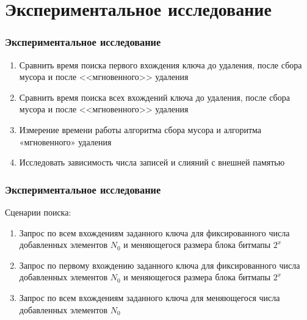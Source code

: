 \documentclass[aspectratio=169, pdf, 8pt, unicode]{beamer}
\begin{document}
\section{Экспериментальное исследование}

\begin{frame}[fragile]
\frametitle{Экспериментальное исследование}

\begin{enumerate}
    \item Сравнить время поиска первого вхождения ключа до удаления,
    после сбора мусора и после <<мгновенного>> удаления
    \vspace{4mm}
    \item Сравнить время поиска всех вхождений ключа до удаления,
    после сбора мусора и после <<мгновенного>> удаления
    \vspace{4mm}
    \item Измерение времени работы алгоритма сбора мусора и алгоритма
    «мгновенного» удаления
    \vspace{4mm}
    \item Исследовать зависимость числа записей и слияний с внешней памятью
\end{enumerate}
\end{frame}

\begin{frame}[fragile]
    \frametitle{Экспериментальное исследование}
{\large Сценарии поиска:}
    \vspace{4mm}
\begin{enumerate}
    \item Запрос по всем вхождениям заданного ключа для фиксированного числа
    добавленных элементов $N_0$ и меняющегося размера блока битмапы $2^{x}$
    \vspace{4mm}
    \item Запрос по первому вхождению заданного ключа для фиксированного числа
    добавленных элементов $N_0$ и меняющегося размера блока битмапы $2^{x}$
    \vspace{4mm}
    \item Запрос по всем вхождениям заданного ключа для меняющегося числа добавленных
    элементов $N_0$
\end{enumerate}
\end{frame}
\end{document}
